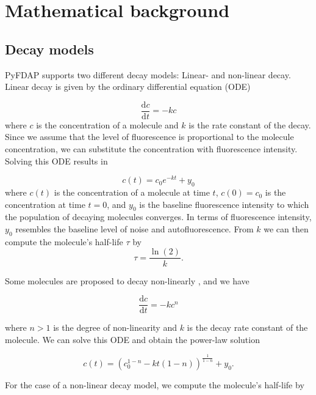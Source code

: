 \documentclass[a4paper,11pt]{article}
\begin{document}
\section{Mathematical background}

\subsection{Decay models}
\label{sec:models}
PyFDAP supports two different decay models: Linear- and non-linear decay. Linear decay is given by the ordinary differential equation (ODE)

\begin{equation*}
 \frac{\mathrm{d}c}{\mathrm{d}t} = -k c
\end{equation*}
\noindent where $c$ is the concentration of a molecule and $k$ is the rate constant of the decay. Since we assume that the level of fluorescence is proportional to the molecule concentration, we can substitute the concentration with fluorescence intensity. Solving this ODE results in 

\begin{equation*}
 c(t)=c_0 e^{-k t} + y_0
\end{equation*}
\noindent where $c(t)$ is the concentration of a molecule at time $t$, $c(0)=c_0$ is the concentration at time $t=0$, and $y_0$ is the baseline fluorescence intensity to which the population of decaying molecules converges. In terms of fluorescence intensity, $y_0$ resembles the baseline level of noise and autofluorescence. From $k$ we can then compute the molecule's half-life $\tau$ by
\begin{equation*}
 \tau= \frac{\ln(2)}{k}.
\end{equation*}

\noindent Some molecules are proposed to decay non-linearly \citep{Eldar2003}, and we have

\begin{equation*}
 \frac{\mathrm{d}c}{\mathrm{d}t} = -k c^n
\end{equation*}

\noindent where $n>1$ is the degree of non-linearity and $k$ is the decay rate constant of the molecule. We can solve this ODE and obtain the power-law solution

\begin{equation*}
 c(t)=\left(c_0^{1-n}  - kt(1-n)  \right)^{\frac{1}{1-n}}+ y_0.
\end{equation*}

\noindent For the case of a non-linear decay model, we compute the molecule's half-life by
\end{document}
